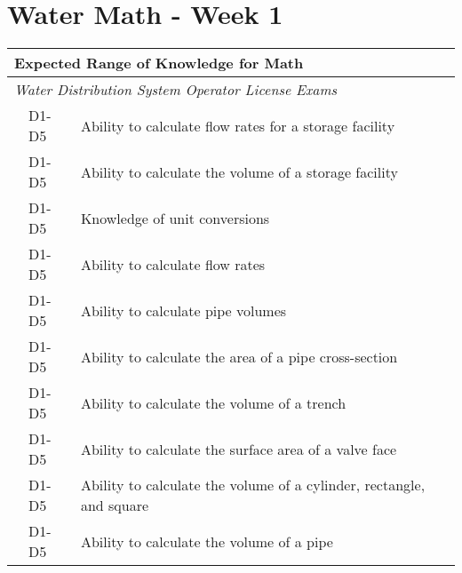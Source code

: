 \chapter{Water Math - Week 1}



\begin{table}[H]
\begin{tabular}{| m{1cm} | m{1cm} | m{12cm} |}
\hline
\multicolumn{3}{|l|}{\textbf{Expected   Range of Knowledge for Math}}                                                                      \\ \hline
\multicolumn{3}{|l|}{\textit{Water   Distribution System Operator License Exams}}                                                          \\ \hline
\multicolumn{1}{l|}{} & \multicolumn{1}{l|}{D1-D5} & Ability to calculate   flow rates for a storage facility                     \\ \cline{2-3} 
\multicolumn{1}{l|}{} & \multicolumn{1}{l|}{D1-D5} & Ability to calculate   the volume of a storage facility                      \\ \cline{2-3} 
\multicolumn{1}{l|}{} & \multicolumn{1}{l|}{D1-D5} & Knowledge of unit   conversions                                              \\ \cline{2-3} 
\multicolumn{1}{l|}{} & \multicolumn{1}{l|}{D1-D5} & Ability to calculate   flow rates                                            \\ \cline{2-3} 
\multicolumn{1}{l|}{} & \multicolumn{1}{l|}{D1-D5} & Ability to calculate   pipe volumes                                          \\ \cline{2-3} 
\multicolumn{1}{l|}{} & \multicolumn{1}{l|}{D1-D5} & Ability to calculate   the area of a pipe cross-section                      \\ \cline{2-3}
\multicolumn{1}{l|}{} & \multicolumn{1}{l|}{D1-D5} & Ability to calculate   the volume of a trench                                \\ \cline{2-3}  
\multicolumn{1}{l|}{} & \multicolumn{1}{l|}{D1-D5} & Ability to calculate   the surface area of a valve face                      \\ \cline{2-3} 
\multicolumn{1}{l|}{} & \multicolumn{1}{l|}{D1-D5} & Ability to calculate   the volume of a cylinder, rectangle, and square       \\ \cline{2-3} 
\multicolumn{1}{l|}{} & \multicolumn{1}{l|}{D1-D5} & Ability to calculate   the volume of a pipe                                  \\ \cline{2-3} 

\end{tabular}
\end{table}
